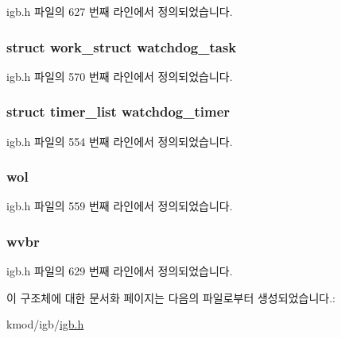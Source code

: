 igb.\+h 파일의 627 번째 라인에서 정의되었습니다.

\subsubsection[{\texorpdfstring{watchdog\+\_\+task}{watchdog_task}}]{\setlength{\rightskip}{0pt plus 5cm}struct work\+\_\+struct watchdog\+\_\+task}\hypertarget{structigb__adapter_a9993a1d4be5ad0cac1e37cdca3d06021}{}\label{structigb__adapter_a9993a1d4be5ad0cac1e37cdca3d06021}


igb.\+h 파일의 570 번째 라인에서 정의되었습니다.

\subsubsection[{\texorpdfstring{watchdog\+\_\+timer}{watchdog_timer}}]{\setlength{\rightskip}{0pt plus 5cm}struct timer\+\_\+list watchdog\+\_\+timer}\hypertarget{structigb__adapter_a52832b6f86ae79e4262b75b36661be68}{}\label{structigb__adapter_a52832b6f86ae79e4262b75b36661be68}


igb.\+h 파일의 554 번째 라인에서 정의되었습니다.

\subsubsection[{\texorpdfstring{wol}{wol}}]{ wol}\hypertarget{structigb__adapter_a9ed903019524c5d830e85c6454814513}{}\label{structigb__adapter_a9ed903019524c5d830e85c6454814513}


igb.\+h 파일의 559 번째 라인에서 정의되었습니다.

\subsubsection[{\texorpdfstring{wvbr}{wvbr}}]{ wvbr}\hypertarget{structigb__adapter_ac18b7024db900539f8c5f4496956a511}{}\label{structigb__adapter_ac18b7024db900539f8c5f4496956a511}


igb.\+h 파일의 629 번째 라인에서 정의되었습니다.



이 구조체에 대한 문서화 페이지는 다음의 파일로부터 생성되었습니다.\+:\begin{DoxyCompactItemize}
\item 
kmod/igb/\hyperlink{kmod_2igb_2igb_8h}{igb.\+h}\end{DoxyCompactItemize}

